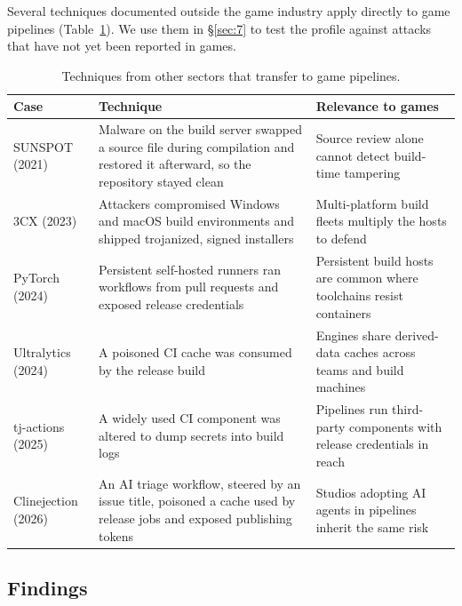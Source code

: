 \documentclass[acmsmall,screen,review]{acmart}
\begin{document}
Several techniques documented outside the game industry apply directly to game pipelines (Table~\ref{tab:2}). We use them in \S\ref{sec:7} to test the profile against attacks that have not yet been reported in games.

\begin{table}[htbp]
\caption{Techniques from other sectors that transfer to game pipelines.}
\label{tab:2}
\small
\begin{tabularx}{\linewidth}{@{}>{\hsize=0.566\hsize\raggedright\arraybackslash}X>{\hsize=1.288\hsize\raggedright\arraybackslash}X>{\hsize=1.147\hsize\raggedright\arraybackslash}X@{}}
\toprule
\textbf{Case} & \textbf{Technique} & \textbf{Relevance to games} \\
\midrule
SUNSPOT \cite{crowdstrike2021sunspot} (2021) & Malware on the build server swapped a source file during compilation and restored it afterward, so the repository stayed clean & Source review alone cannot detect build-time tampering \\
3CX \cite{mandiant20233cx} (2023) & Attackers compromised Windows and macOS build environments and shipped trojanized, signed installers & Multi-platform build fleets multiply the hosts to defend \\
PyTorch \cite{stawinski2024playing} (2024) & Persistent self-hosted runners ran workflows from pull requests and exposed release credentials & Persistent build hosts are common where toolchains resist containers \\
Ultralytics \cite{larson2024supply} (2024) & A poisoned CI cache was consumed by the release build & Engines share derived-data caches across teams and build machines \\
tj-actions \cite{stepsecurity2025harden} (2025) & A widely used CI component was altered to dump secrets into build logs & Pipelines run third-party components with release credentials in reach \\
Clinejection \cite{khan2026clinejection} (2026) & An AI triage workflow, steered by an issue title, poisoned a cache used by release jobs and exposed publishing tokens & Studios adopting AI agents in pipelines inherit the same risk \\
\bottomrule
\end{tabularx}
\end{table}


\subsection{Findings}\label{sec:3.2}
\end{document}

